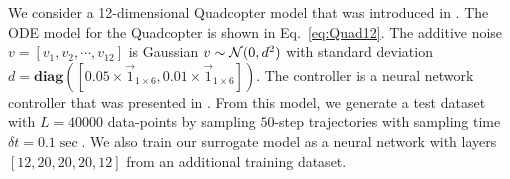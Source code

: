 We consider a 12-dimensional Quadcopter model that was introduced in \cite{huang2022polar}. The ODE model for the Quadcopter is shown in Eq.~\eqref{eq:Quad12}. The additive noise $v=\left[v_1, v_2, \cdots, v_{12}\right]$ is Gaussian $v \sim \mathcal{N}(0, d^2)$ with standard deviation $d= \mathbf{diag}([0.05\times \vec{1}_{1 \times 6},0.01\times \vec{1}_{1 \times 6}])$. The controller is a neural network controller that was presented in \cite{huang2022polar}. From this model, we generate a test dataset with  $L=40000$ data-points by sampling $50$-step trajectories with sampling time $\delta t = 0.1 \sec$.  We also train our surrogate model as a neural network with  layers $[12,20,20,20,12]$ from an additional training dataset.
